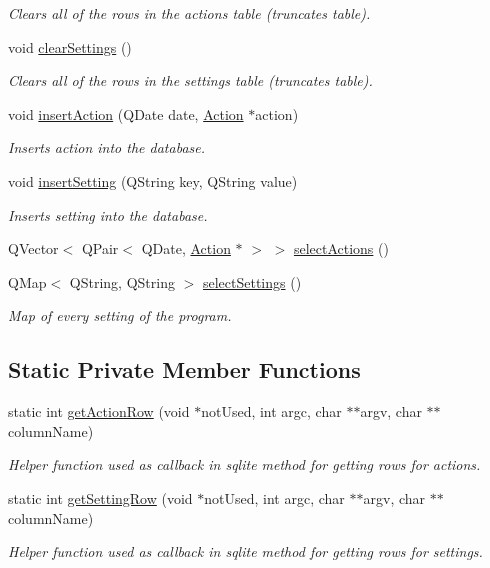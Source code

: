 \begin{DoxyCompactItemize}
\begin{DoxyCompactList}\small\item\em Clears all of the rows in the actions table (truncates table). \end{DoxyCompactList}\item 
void \hyperlink{class_database_a49483f5668fe0627beab7763d6891bbd}{clear\-Settings} ()
\begin{DoxyCompactList}\small\item\em Clears all of the rows in the settings table (truncates table). \end{DoxyCompactList}\item 
void \hyperlink{class_database_a8b535ecf44b6d41e268750acccf40dc1}{insert\-Action} (Q\-Date date, \hyperlink{class_action}{Action} $\ast$action)
\begin{DoxyCompactList}\small\item\em Inserts action into the database. \end{DoxyCompactList}\item 
void \hyperlink{class_database_af56fc28d1c9a35ccd8ebe47f2e6ce696}{insert\-Setting} (Q\-String key, Q\-String value)
\begin{DoxyCompactList}\small\item\em Inserts setting into the database. \end{DoxyCompactList}\item 
Q\-Vector$<$ Q\-Pair$<$ Q\-Date, \hyperlink{class_action}{Action} $\ast$ $>$ $>$ \hyperlink{class_database_ad796e97b41e4a8707017f70142c6160d}{select\-Actions} ()
\item 
Q\-Map$<$ Q\-String, Q\-String $>$ \hyperlink{class_database_ad4b61d5826ea3eea0b3e539a90b77c04}{select\-Settings} ()
\begin{DoxyCompactList}\small\item\em Map of every setting of the program. \end{DoxyCompactList}\end{DoxyCompactItemize}
\subsection*{Static Private Member Functions}
\begin{DoxyCompactItemize}
\item 
static int \hyperlink{class_database_a1f9290561a0a91c102cb8d923c3fec7e}{get\-Action\-Row} (void $\ast$not\-Used, int argc, char $\ast$$\ast$argv, char $\ast$$\ast$column\-Name)
\begin{DoxyCompactList}\small\item\em Helper function used as callback in sqlite method for getting rows for actions. \end{DoxyCompactList}\item 
static int \hyperlink{class_database_a67e6a9023b5d1d829ba5ac68f33cb5b7}{get\-Setting\-Row} (void $\ast$not\-Used, int argc, char $\ast$$\ast$argv, char $\ast$$\ast$column\-Name)
\begin{DoxyCompactList}\small\item\em Helper function used as callback in sqlite method for getting rows for settings. \end{DoxyCompactList}\end{DoxyCompactItemize}
